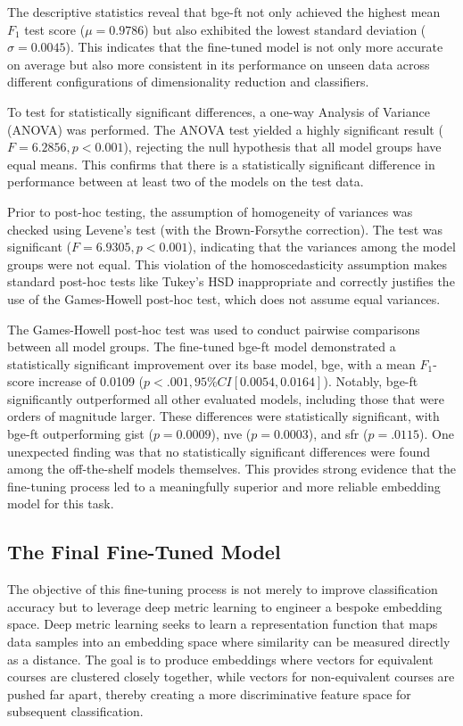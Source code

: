The descriptive statistics reveal that bge-ft not only achieved the highest mean \(F_1\) test score (\(\mu = 0.9786\)) but also exhibited the lowest standard deviation (\(\sigma = 0.0045\)). This indicates that the fine-tuned model is not only more accurate on average but also more consistent in its performance on unseen data across different configurations of dimensionality reduction and classifiers.

To test for statistically significant differences, a one-way Analysis of Variance (ANOVA) was performed. The ANOVA test yielded a highly significant result (\(F=6.2856, p<0.001\)), rejecting the null hypothesis that all model groups have equal means. This confirms that there is a statistically significant difference in performance between at least two of the models on the test data.

Prior to post-hoc testing, the assumption of homogeneity of variances was checked using Levene's test (with the Brown-Forsythe correction). The test was significant (\(F=6.9305, p<0.001\)), indicating that the variances among the model groups were not equal. This violation of the homoscedasticity assumption makes standard post-hoc tests like Tukey's HSD inappropriate and correctly justifies the use of the Games-Howell post-hoc test, which does not assume equal variances.

The Games-Howell post-hoc test was used to conduct pairwise comparisons between all model groups. The fine-tuned bge-ft model demonstrated a statistically significant improvement over its base model, bge, with a mean \(F_1\)-score increase of 0.0109 (\(p<.001, 95\% CI [0.0054, 0.0164]\)). Notably, bge-ft significantly outperformed all other evaluated models, including those that were orders of magnitude larger. These differences were statistically significant, with bge-ft outperforming gist (\(p=0.0009\)), nve (\(p=0.0003\)), and sfr (\(p=.0115\)). One unexpected finding was that no statistically significant differences were found among the off-the-shelf models themselves. This provides strong evidence that the fine-tuning process led to a meaningfully superior and more reliable embedding model for this task.{\setlength{\emergencystretch}{5em}\par}

\subsection{The Final Fine-Tuned Model}
The objective of this fine-tuning process is not merely to improve classification accuracy but to leverage deep metric learning to engineer a bespoke embedding space. Deep metric learning seeks to learn a representation function that maps data samples into an embedding space where similarity can be measured directly as a distance. The goal is to produce embeddings where vectors for equivalent courses are clustered closely together, while vectors for non-equivalent courses are pushed far apart, thereby creating a more discriminative feature space for subsequent classification.

